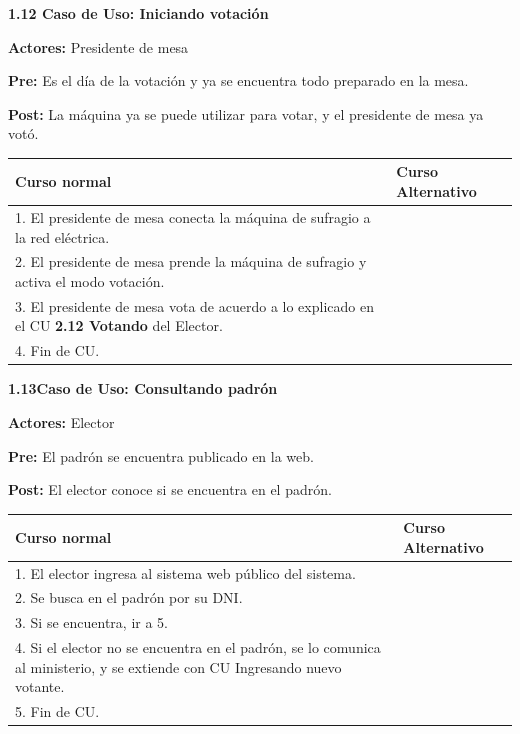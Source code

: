 \textbf{1.12 Caso de Uso: Iniciando votación}

\textbf{Actores:} Presidente de mesa

\textbf{Pre:} Es el día de la votación y ya se encuentra todo preparado en la mesa.

\textbf{Post:} La máquina ya se puede utilizar para votar, y el presidente de mesa ya votó.

\begin{table}[h!]
	
 \begin{tabular}{|p{7.5cm} | p{7.5cm}|} 
 \hline
 \textbf{Curso normal} & \textbf{Curso Alternativo} \\
 \hline

1. El presidente de mesa conecta la máquina de sufragio a la red eléctrica. & \\
\hline
2. El presidente de mesa prende la máquina de sufragio y activa el modo votación. & \\
\hline
3. El presidente de mesa vota de acuerdo a lo explicado en el CU \textbf{2.12 Votando} del Elector. & \\
\hline
4. Fin de CU.& \\
\hline



 \end{tabular}

\end{table}


\textbf{1.13Caso de Uso:  Consultando padrón}

\textbf{Actores:} Elector 

\textbf{Pre:} El padrón se encuentra publicado en la web. 

\textbf{Post:}  El elector conoce si se encuentra en el padrón.

\begin{table}[h!]
	
 \begin{tabular}{|p{7.5cm} | p{7.5cm}|} 
 \hline
 \textbf{Curso normal} & \textbf{Curso Alternativo} \\
 \hline

1. El elector ingresa al sistema web público del sistema. & \\
 \hline



2. Se busca en el padrón por su DNI. & \\
 \hline



3. Si se encuentra, ir a 5. & \\
 \hline



4. Si el elector no se encuentra en el padrón, se lo comunica al ministerio, y se extiende con CU Ingresando nuevo votante. & \\
 \hline



5. Fin de CU. & \\
 \hline


 \end{tabular}

\end{table}


